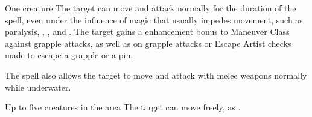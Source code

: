 \begin{spellheader}
    \spellrng{\rngtouch}
    \spelldur{\durshort}
\end{spellheader}
\begin{spelleffects}
    \begin{spelltarget}{One creature}
        \spelleffect The target can move and attack normally for the duration of the spell, even under the influence of magic that usually impedes movement, such as paralysis, , , and . The target gains a  enhancement bonus to Maneuver Class against grapple attacks, as well as on grapple attacks or Escape Artist checks made to escape a grapple or a pin.
        \par The spell also allows the target to move and attack with melee weapons normally while underwater.
    \end{spelltarget}
\end{spelleffects}
\begin{spellfooter}
    
\end{spellfooter}

\begin{spellheader}
\end{spellheader}
\begin{spelleffects}
    \begin{spelltargets}{Up to five creatures in the area}
        \spelleffect The target can move freely, as .
    \end{spelltargets}
\end{spelleffects}
\begin{spellfooter}
    
\end{spellfooter}

\begin{comment}
\subsubsection{G}
\end{comment}


